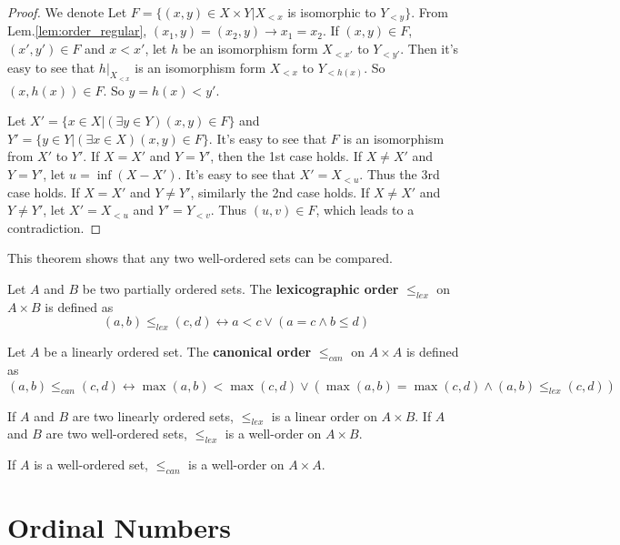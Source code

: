 \documentclass[12pt]{book}
\begin{document}
\begin{proof}
	We denote
	Let $F=\{(x,y)\in X\times Y|X_{<x}$ is isomorphic to $Y_{<y}\}$. From Lem.\ref{lem:order_regular}, $(x_1,y)=(x_2,y)\rightarrow x_1=x_2$. If $(x,y)\in F$, $(x',y')\in F$ and $x< x'$, let $h$ be an isomorphism form $X_{<x'}$ to $Y_{<y'}$. Then it's easy to see that $h|_{X_{<x}}$ is an isomorphism form $X_{<x}$ to $Y_{<h(x)}$. So $(x,h(x))\in F$. So $y=h(x)<y'$.
	
	Let $X'=\{x\in X|(\exists y\in Y)(x,y)\in F\}$ and $Y'=\{y\in Y|(\exists x\in X)(x,y)\in F\}$. It's easy to see that $F$ is an isomorphism from $X'$ to $Y'$. If $X=X'$ and $Y=Y'$, then the 1st case holds. If $X\neq X'$ and $Y=Y'$, let $u=\inf(X-X')$. It's easy to see that $X'=X_{<u}$. Thus the 3rd case holds. If $X= X'$ and $Y\neq Y'$, similarly the 2nd case holds. If $X\neq X'$ and $Y\neq Y'$, let $X'=X_{<u}$ and $Y'=Y_{<v}$. Thus $(u,v)\in F$, which leads to a contradiction.
\end{proof}
This theorem shows that any two well-ordered sets can be compared.
\begin{definition}
	Let $A$ and $B$ be two partially ordered sets. The {\bf lexicographic order} $\leq_{lex}$ on $A\times B$ is defined as
	\begin{equation}
		(a,b)\leq_{lex}(c,d)\leftrightarrow a<c \vee(a=c\wedge b\leq d)
	\end{equation}
\end{definition}
\begin{definition}
	Let $A$ be a linearly ordered set. The {\bf canonical order} $\leq_{can}$ on $A\times A$ is defined as
	\begin{equation}
		(a,b)\leq_{can}(c,d)\leftrightarrow \max(a,b)<\max(c,d) \vee(\max(a,b)=\max(c,d)\wedge (a,b)\leq_{lex}(c,d))
	\end{equation}
\end{definition}

\begin{lemma}
	If $A$ and $B$ are two linearly ordered sets, $\leq_{lex}$ is a linear order on $A\times B$. If $A$ and $B$ are two well-ordered sets, $\leq_{lex}$ is a well-order on $A\times B$.
\end{lemma}

\begin{lemma}
	If $A$ is a well-ordered set, $\leq_{can}$ is a well-order on $A\times A$.
\end{lemma}

\chapter{Ordinal Numbers}
\end{document}
